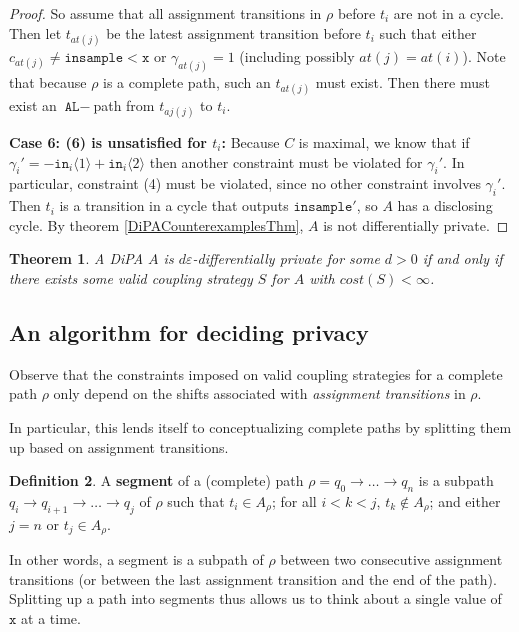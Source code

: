 \documentclass[12pt]{article}
\newcommand{\lguard}[1][x]{\texttt{insample} < #1}
\newcommand{\brangle}[1]{\langle #1 \rangle}
\newtheorem{thm}{Theorem}[section]
\theoremstyle{definition}
\newtheorem{defn}[thm]{Definition}
\begin{document}
\begin{proof}
    So assume that all assignment transitions in $\rho$ before $t_i$ are not in a cycle. Then let $t_{at(j)}$ be the latest assignment transition before $t_i$ such that either $c_{at(j)} \neq \lguard[\texttt{x}]$ or $\gamma_{at(j)} = 1$ (including possibly $at(j)=at(i)$). Note that because $\rho$ is a complete path, such an $t_{at(j)}$ must exist. Then there must exist an $\texttt{AL}-$path from $t_{aj(j)}$ to $t_i$. 
    
    \textbf{Case 6: (6) is unsatisfied for $t_i$:} Because $C$ is maximal, we know that if $\gamma_i' = -\texttt{in}_i\brangle{1}+\texttt{in}_i\brangle{2}$ then another constraint must be violated for $\gamma_i'$. In particular, constraint (4) must be violated, since no other constraint involves $\gamma_i'$. 
    Then $t_i$ is a transition in a cycle that outputs $\texttt{insample}'$, so $A$ has a disclosing cycle. By theorem \ref{DiPACounterexamplesThm}, $A$ is not differentially private. 

\end{proof}


\begin{thm}
    A DiPA $A$ is $d\varepsilon$-differentially private for some $d>0$ if and only if there exists some valid coupling strategy $S$ for $A$ with $cost(S)<\infty$. 
\end{thm}

\subsection{An algorithm for deciding privacy}

Observe that the constraints imposed on valid coupling strategies for a complete path $\rho$ only depend on the shifts associated with \textit{assignment transitions} in $\rho$. 

In particular, this lends itself to conceptualizing complete paths by splitting them up based on assignment transitions. 

\begin{defn}
    A \textbf{segment} of a (complete) path $\rho = q_0\to\ldots\to q_n$ is a subpath $q_i \to q_{i+1}\to \ldots \to q_j$ of $\rho$ such that $t_i \in A_\rho$; for all $i<k<j$, $t_k \notin A_\rho$; and either $j=n$ or $t_j \in A_\rho$.
\end{defn}

In other words, a segment is a subpath of $\rho$ between two consecutive assignment transitions (or between the last assignment transition and the end of the path). Splitting up a path into segments thus allows us to think about a single value of $\texttt{x}$ at a time.
\end{document}
